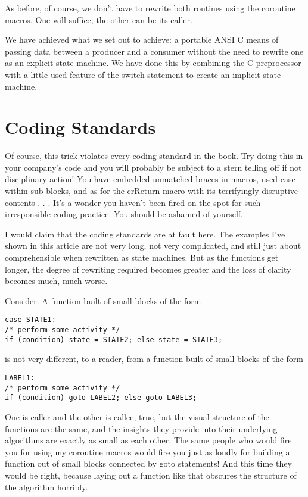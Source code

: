 \documentclass[12pt]{article}
\begin{document}
\begin{CJK}{UTF8}{bsmi}
As before, of course, we don't have to rewrite both routines using the coroutine macros. One will suffice; the other can be its caller.

We have achieved what we set out to achieve: a portable ANSI C means of passing data between a producer and a consumer without the need to rewrite one as an explicit state machine. We have done this by combining the C preprocessor with a little-used feature of the switch statement to create an implicit state machine.

\section{Coding Standards}

Of course, this trick violates every coding standard in the book. Try doing this in your company's code and you will probably be subject to a stern telling off if not disciplinary action! You have embedded unmatched braces in macros, used case within sub-blocks, and as for the crReturn macro with its terrifyingly disruptive contents . . . It's a wonder you haven't been fired on the spot for such irresponsible coding practice. You should be ashamed of yourself.

I would claim that the coding standards are at fault here. The examples I've shown in this article are not very long, not very complicated, and still just about comprehensible when rewritten as state machines. But as the functions get longer, the degree of rewriting required becomes greater and the loss of clarity becomes much, much worse.

Consider. A function built of small blocks of the form

\begin{lstlisting}[basicstyle=\footnotesize, breaklines=true]
case STATE1:
/* perform some activity */
if (condition) state = STATE2; else state = STATE3;
\end{lstlisting}

is not very different, to a reader, from a function built of small blocks of the form

\begin{lstlisting}[basicstyle=\footnotesize, breaklines=true]
LABEL1:
/* perform some activity */
if (condition) goto LABEL2; else goto LABEL3;
\end{lstlisting}

One is caller and the other is callee, true, but the visual structure of the functions are the same, and the insights they provide into their underlying algorithms are exactly as small as each other. The same people who would fire you for using my coroutine macros would fire you just as loudly for building a function out of small blocks connected by goto statements! And this time they would be right, because laying out a function like that obscures the structure of the algorithm horribly.


\end{CJK}
\end{document}
